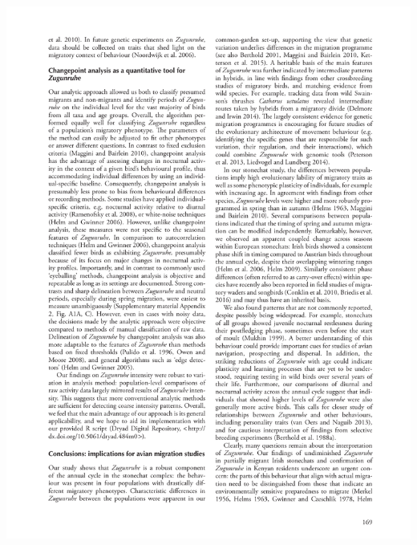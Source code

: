 \documentclass[a4paper, twoside]{templates/ociamthesis}
\begin{document}
\begin{center}\includegraphics[width=1\linewidth]{pdf_chapters/zug/zug_crop_Part15} \end{center}
\end{document}
